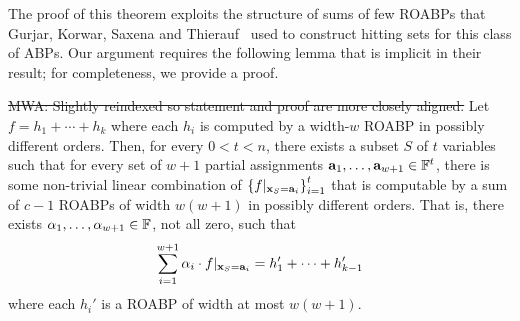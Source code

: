 \documentclass[11pt]{article}
\newcommand{\Mattnote}[1]{\textcolor{OliveGreen}{MWA: #1}}
\newcommand{\BLnote}[1]{\textcolor{Blue}{BLV: #1}}
\providecommand{\DIFdel}[1]{{\protect\color{red}\sout{#1}}}                      %
\providecommand{\DIFdelbegin}{} %
\providecommand{\DIFdelend}{} %
\begin{document}
The proof of this theorem exploits the structure of sums of few ROABPs that Gurjar, Korwar, Saxena and Thierauf~\cite{GKST15} used to construct hitting sets for this class of ABPs.
Our argument requires the following lemma that is implicit in their result; for completeness, we provide a proof.

\begin{lemma}\label{lem:sum-of-ROABP-structure}
\DIFdelbegin \DIFdel{\Mattnote{Slightly reindexed so statement and proof are more closely aligned.}
}\DIFdelend %
Let $f = h_1 + \cdots + h_k$ where each $h_i$ is computed by a width-$w$ ROABP in possibly different orders.
Then, for every $0 < t < n$, there exists a subset $S$ of $t$ variables such that for every set of $w+1$ partial assignments $\veca_1, \ldots, \veca_{w+1} \in \F^{t}$, there is some non-trivial linear combination of $\left\{ f|_{\mathbf{x}_S=\mathbf{a}_i} \right\}_{i=1}^t$ that is computable by a sum of $c-1$ ROABPs of width $w(w+1)$ in possibly different orders.
That is, there exists $\alpha_1, \ldots, \alpha_{w+1} \in \F$, not all zero, such that
\[
\sum_{i=1}^{w+1} \alpha_i \cdot f|_{\mathbf{x}_S = \mathbf{a}_i} = h_1' + \cdots + h_{k-1}'
\]
where each $h_i'$ is a ROABP of width at most $w(w+1)$. 
\end{lemma}
\end{document}
